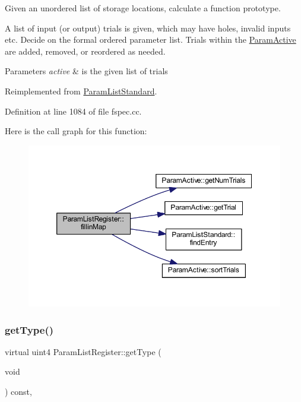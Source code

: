 Given an unordered list of storage locations, calculate a function prototype. 

A list of input (or output) trials is given, which may have holes, invalid inputs etc. Decide on the formal ordered parameter list. Trials within the \mbox{\hyperlink{class_param_active}{Param\+Active}} are added, removed, or reordered as needed. 
\begin{DoxyParams}{Parameters}
{\em active} & is the given list of trials \\
\hline
\end{DoxyParams}


Reimplemented from \mbox{\hyperlink{class_param_list_standard_a7fa7043f5c6bba995e2ea716ca16ccaf}{Param\+List\+Standard}}.



Definition at line 1084 of file fspec.\+cc.

Here is the call graph for this function\+:
\nopagebreak
\begin{figure}[H]
\begin{center}
\leavevmode
\includegraphics[width=350pt]{class_param_list_register_a35bf1a7b1033500cb3657608c27d4786_cgraph}
\end{center}
\end{figure}
\mbox{\label{class_param_list_register_af11af105230d3d6bf2824ae8b6a527a6}} 
\subsubsection{\texorpdfstring{getType()}{getType()}}
{\footnotesize\ttfamily virtual uint4 Param\+List\+Register\+::get\+Type (\begin{DoxyParamCaption}\item[{void}]{ }\end{DoxyParamCaption}) const\hspace{0.3cm}{\ttfamily [inline]}, {\ttfamily [virtual]}}



